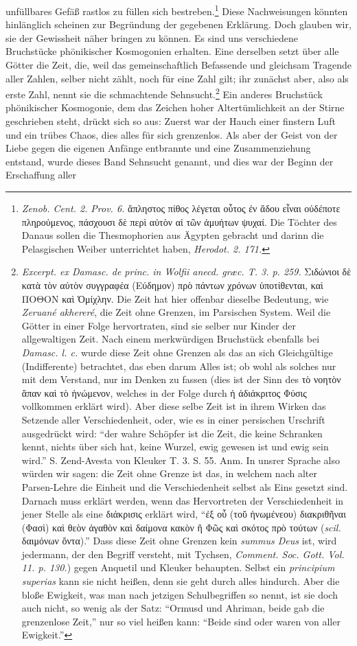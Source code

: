 \documentclass[a4paper, 11pt, oneside]{article}
\begin{document}
unfüllbares Gefäß rastlos zu füllen sich bestreben.\footnote{\emph{Zenob. Cent. 2. Prov. 6.} ἄπληστος πίθος λέγεται οὗτος ἐν ἄδου εἶναι οὐδέποτε πληροὐμενος, πάσχουσι δὲ περὶ αὐτὸν αἱ τῶν ἀμυήτων ψυχαί. Die Töchter des Danaus sollen die Thesmophorien aus Ägypten gebracht und darinn die Pelasgischen Weiber unterrichtet haben, \emph{Herodot. 2. 171.}} Diese Nachweisungen könnten hinlänglich scheinen zur Begründung der gegebenen Erklärung. Doch glauben wir, sie der Gewissheit näher bringen zu können. Es sind uns verschiedene Bruchstücke phönikischer Kosmogonien erhalten. Eine derselben setzt über alle Götter die Zeit, die, weil das gemeinschaftlich Befassende und gleichsam Tragende aller Zahlen, selber nicht zählt, noch für eine Zahl gilt; ihr zunächst aber, also als erste Zahl, nennt sie die schmachtende Sehnsucht.\footnote{\emph{Excerpt. ex Damasc. de princ. in Wolfii anecd. græc. T. 3. p. 259.} Σιδώνιοι δὲ κατὰ τὸν αὐτὸν συγγραφέα (Εύδημον) πρὸ πάντων χρόνων ὑποτίθενται, καὶ ΠΟΘΟΝ καὶ Ὁμίχλην. Die Zeit hat hier offenbar dieselbe Bedeutung, wie \emph{Zeruané akhereré}, die Zeit ohne Grenzen, im Parsischen System. Weil die Götter in einer Folge hervortraten, sind sie selber nur Kinder der allgewaltigen Zeit. Nach einem merkwürdigen Bruchstück ebenfalls bei \emph{Damasc. l. c.} wurde diese Zeit ohne Grenzen als das an sich Gleichgültige (Indifferente) betrachtet, das eben darum Alles ist; ob wohl als solches nur mit dem Verstand, nur im Denken zu fassen (dies ist der Sinn des τὸ νοητὸν ἅπαν καὶ τὸ ἡνώμενον, welches in der Folge durch ἡ ἀδιάκριτος Φύσις vollkommen erklärt wird). Aber diese selbe Zeit ist in ihrem Wirken das Setzende aller Verschiedenheit, oder, wie es in einer persischen Urschrift ausgedrückt wird: "`der wahre Schöpfer ist die Zeit, die keine Schranken kennt, nichts über sich hat, keine Wurzel, ewig gewesen ist und ewig sein wird."' S. Zend-Avesta von Kleuker T. 3. S. 55. Anm. In unsrer Sprache also würden wir sagen: die Zeit ohne Grenze ist das, in welchem nach alter Parsen-Lehre die Einheit und die Verschiedenheit selbst als Eins gesetzt sind. Darnach muss erklärt werden, wenn das Hervortreten der Verschiedenheit in jener Stelle als eine διάκρισις erklärt wird, "`ἐξ οὗ (τοῠ ἡνωμένεου) διακριθῆναι (Φασὶ) καὶ θεὸν ἀγαθὸν καὶ δαίμονα κακὸν ἢ Φῶς καὶ σκότος πρὸ τούτων (\emph{scil.} δαιμόνων ὄντα)."' Dass diese Zeit ohne Grenzen kein \emph{summus Deus} ist, wird jedermann, der den Begriff versteht, mit Tychsen, \emph{Comment. Soc. Gott. Vol. 11. p. 130.}) gegen Anquetil und Kleuker behaupten. Selbst ein \emph{principium superias} kann sie nicht heißen, denn sie geht durch alles hindurch. Aber die bloße Ewigkeit, was man nach jetzigen Schulbegriffen so nennt, ist sie doch auch nicht, so wenig als der Satz: "`Ormusd und Ahriman, beide gab die grenzenlose Zeit,"' nur so viel heißen kann: "`Beide sind oder waren von aller Ewigkeit."'} Ein anderes Bruchstück phönikischer Kosmogonie, dem das Zeichen hoher Altertümlichkeit an der Stirne geschrieben steht, drückt sich so aus: Zuerst war der Hauch einer finstern Luft und ein trübes Chaos, dies alles für sich grenzenlos. Als aber der Geist von der Liebe gegen die eigenen Anfänge entbrannte und eine Zusammenziehung entstand, wurde dieses Band Sehnsucht genannt, und dies war der Beginn der Erschaffung aller 
\end{document}
